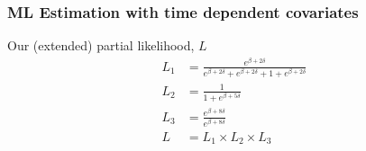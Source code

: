 \documentclass{beamer}
\theoremstyle{definition}
\begin{document}
\begin{frame}
\frametitle{ML Estimation with time dependent covariates}
\begin{block}{Our (extended) partial likelihood, $L$}
\begin{align*}
L_1 & = \frac{e^{\beta+2\delta}}{e^{\beta+2\delta} + e^{\beta+2\delta} + 1 + e^{\beta+2\delta}} \\
L_2 & = \frac{1}{1+e^{\beta+5\delta}} \\
L_3 & = \frac{e^{\beta + 8\delta}}{e^{\beta + 8\delta}} \\
L & = L_1 \times L_2 \times L_3
\end{align*}
\end{block}
\end{frame}
\end{document}
